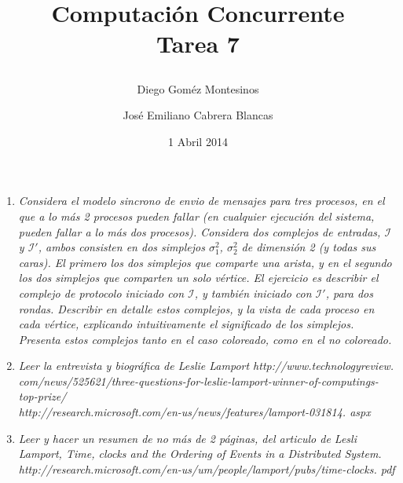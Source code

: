 \documentclass{article}
\title{ Computación Concurrente \\ \Large{Tarea 7}
\author{
  Diego Goméz Montesinos
  \and
  José Emiliano Cabrera Blancas
  }
\date{1 Abril 2014}
}
\begin{document}
\maketitle
\begin{enumerate}
  
  \item{
    \textsl{
      Considera el modelo sincrono de envio de mensajes para tres
      procesos, en el que a lo más 2 procesos pueden fallar (en
      cualquier ejecución del sistema, pueden fallar a lo más dos
      procesos). Considera dos complejos de entradas, $\mathcal{I}$ y
      $\mathcal{I}'$, ambos consisten en dos simplejos $\sigma_{1}^2$,
      $\sigma_{2}^2$ de dimensión 2 (y todas sus caras). El primero
      los dos simplejos que comparte una arista, y en el segundo los
      dos simplejos que comparten un solo vértice. El ejercicio es
      describir el complejo de protocolo iniciado con $\mathcal{I}$, y
      también iniciado con $\mathcal{I}'$, para dos rondas. Describir
      en detalle estos complejos, y la vista de cada proceso en cada
      vértice, explicando intuitivamente el significado de los
      simplejos. Presenta estos complejos tanto en el caso coloreado,
      como en el no coloreado.
    } 
  }

\item{
    \textsl{
      Leer la entrevista y biográfica de Leslie Lamport
      http://www.technologyreview. com/news/525621/three-questions-for-leslie-lamport-winner-of-computings-top-prize/
      \\ http://research.microsoft.com/en-us/news/features/lamport-031814.
aspx 
    }
  }

\item{
    \textsl{
      Leer y hacer un resumen de no más de 2 páginas, del articulo de
      Lesli Lamport, \textit{Time, clocks and the Ordering of Events
        in a Distributed System}. \\
      http://research.microsoft.com/en-us/um/people/lamport/pubs/time-clocks. pdf
    }
    
}
\end{enumerate}
\end{document}
